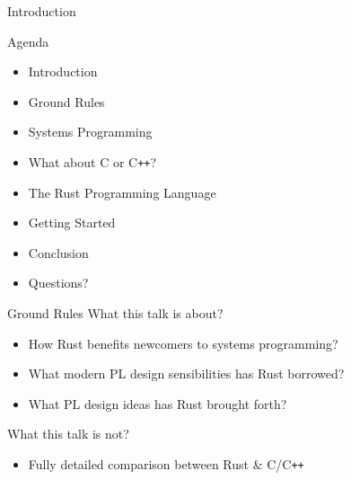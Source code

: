 \begin{section}{Introduction}
  \begin{frame}{Agenda}
    \begin{itemize}
    \item Introduction
    \item Ground Rules
    \item Systems Programming
    \item What about C or C\texttt{++}?
    \item The Rust Programming Language
    \item Getting Started
    \item Conclusion
    \item Questions?
    \end{itemize}
  \end{frame}

  \begin{frame}{Ground Rules}
    What this talk is about?
    \begin{itemize}
    \item How Rust benefits newcomers to systems programming?
    \item What modern PL design sensibilities has Rust borrowed?
    \item What PL design ideas has Rust brought forth?
    \end{itemize}

    What this talk is not?
    \begin{itemize}
    \item Fully detailed comparison between Rust \& C/C\texttt{++}
    \end{itemize}
  \end{frame}
\end{section}
